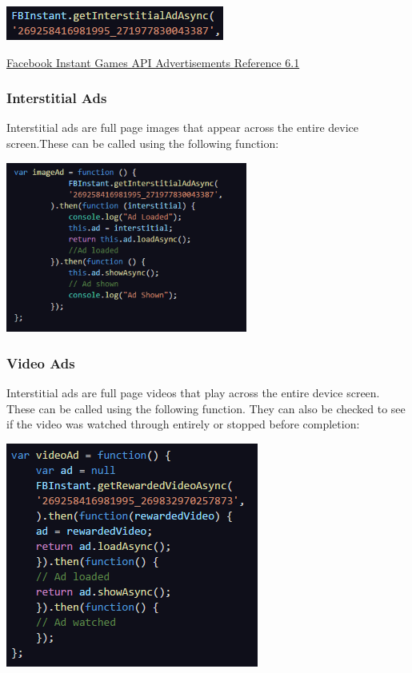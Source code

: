 \documentclass{article}
\begin{document}
\begin{center}
\includegraphics[]{images/UniqueAd.png}
\end{center}

\vspace{.5cm}
\href{https://developers.facebook.com/docs/games/instant-games/sdk/fbinstant6.1#adinstance}{Facebook Instant Games API Advertisements Reference 6.1}

\subsubsection{Interstitial Ads}
Interstitial ads are full page images that appear across the entire device screen.These can be called using the following function:

\begin{center}
\includegraphics[width = 300px]{images/InterstitialAds.png}
\end{center}

\subsubsection{Video Ads}
Interstitial ads are full page videos that play across the entire device screen. These can be called using the following function. They can also be checked to see if the video was watched through entirely or stopped before completion:

\begin{center}
\includegraphics[]{images/VideoAds.png}
\end{center}
\end{document}
